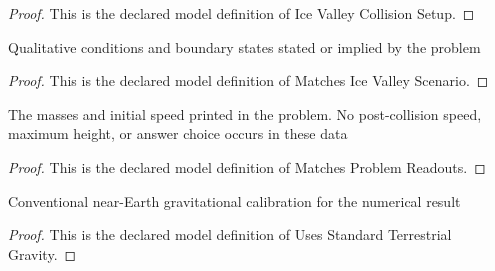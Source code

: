 \begin{proof}
  This is the declared model definition of Ice Valley Collision Setup.
\end{proof}
\begin{definition}
  \label{def:physics:phyx-mini-0764:phyxminiproblems-problemphyxmini0764-matchesicevalleyscenario}
  Qualitative conditions and boundary states stated or implied by the problem
\end{definition}
\begin{proof}
  This is the declared model definition of Matches Ice Valley Scenario.
\end{proof}
\begin{definition}
  \label{def:physics:phyx-mini-0764:phyxminiproblems-problemphyxmini0764-matchesproblemreadouts}
  The masses and initial speed printed in the problem. No post-collision speed, maximum height, or answer choice occurs in these data
\end{definition}
\begin{proof}
  This is the declared model definition of Matches Problem Readouts.
\end{proof}
\begin{definition}
  \label{def:physics:phyx-mini-0764:phyxminiproblems-problemphyxmini0764-usesstandardterrestrialgravity}
  Conventional near-Earth gravitational calibration for the numerical result
\end{definition}
\begin{proof}
  This is the declared model definition of Uses Standard Terrestrial Gravity.
\end{proof}

